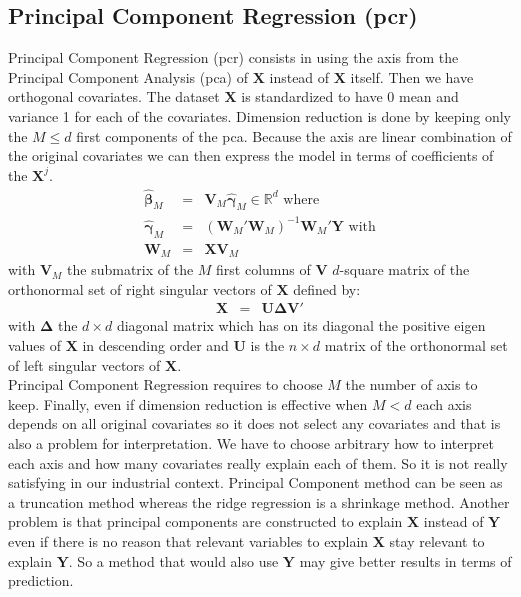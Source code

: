 \documentclass[12pt,a4paper]{report}
\begin{document}
		\subsection{Principal Component Regression ({\sc pcr})}
	Principal Component Regression ({\sc pcr})\cite{jackson2005user} consists in using the axis from the Principal Component Analysis ({\sc pca}) of $\boldsymbol{X}$ instead of $\boldsymbol{X}$ itself. Then we have orthogonal covariates. The dataset $\boldsymbol{X}$ is standardized to have 0 mean and variance 1 for each of the covariates. Dimension reduction is done by keeping only the $M \leq d$ first components of the {\sc pca}. Because the axis are linear combination of the original covariates we can then express the model in terms of coefficients of the $\boldsymbol{X}^j$.\\
	\begin{eqnarray}
		\hat{\boldsymbol{\beta}}_M&=&\boldsymbol{V}_M\hat{\boldsymbol{\gamma}}_M \in \mathbb{R}^d \textrm{ where}  \nonumber \\
		\hat{\boldsymbol{\gamma}}_M&=&(\boldsymbol{W}_M'\boldsymbol{W}_M)^{-1}\boldsymbol{W}_M'\boldsymbol{Y} \textrm{ with} \nonumber  \\
		\boldsymbol{W}_M&=&\boldsymbol{X}\boldsymbol{V}_M \nonumber 
	\end{eqnarray}
	with $\boldsymbol{V}_M$ the submatrix of the $M$ first columns of $\boldsymbol{V}$ $d$-square matrix of the orthonormal set of right singular vectors of $\boldsymbol{X}$ defined by:
	\begin{eqnarray}
		\boldsymbol{X}&=&\boldsymbol{U}\boldsymbol{\Delta}\boldsymbol{V}' \nonumber 
	\end{eqnarray}
	with $\boldsymbol{\Delta}$ the $d\times d$ diagonal matrix which has on its diagonal the positive eigen values of $\boldsymbol{X}$ in descending order and $\boldsymbol{U}$ is the $n\times d$ matrix of the orthonormal set of left singular vectors of $\boldsymbol{X}$.\\
	
	Principal Component Regression requires to choose $M$ the number of axis to keep. Finally, even if dimension reduction is effective when $M<d$ each axis depends on all original covariates so it does not select any covariates and that is also a problem for interpretation. We have to choose arbitrary how to interpret each axis and how many covariates really explain each of them. So it is not really satisfying in our industrial context. Principal Component method can be seen as a truncation method whereas the ridge regression is a shrinkage method. Another problem is that principal components are constructed to explain $\boldsymbol{X}$ instead of $\boldsymbol{Y}$ even if there is no reason that relevant variables to explain $\boldsymbol{X}$ stay relevant to explain $\boldsymbol{Y}$. So a method that would also use $\boldsymbol{Y}$ may give better results in terms of prediction.\\
	
\end{document}
